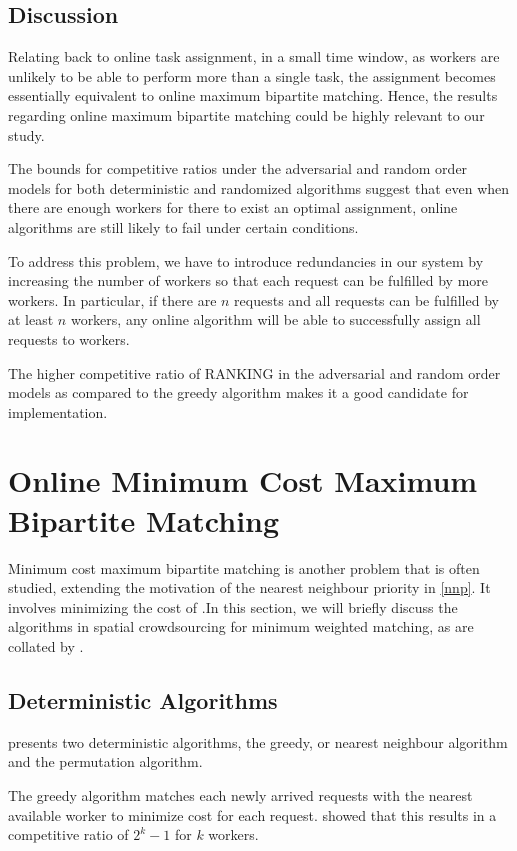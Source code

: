 \documentclass[urop]{socreport}
\begin{document}
\subsection{Discussion}
Relating back to online task assignment, in a small time window, as workers are unlikely to be able to perform more than a single task, the assignment becomes essentially equivalent to online maximum bipartite matching. Hence, the results regarding online maximum bipartite matching could be highly relevant to our study.  

The bounds for competitive ratios under the adversarial and random order models for both deterministic and randomized algorithms suggest that even when there are enough workers for there to exist an optimal assignment, online algorithms are still likely to fail under certain conditions. 

To address this problem, we have to introduce redundancies in our system by increasing the number of workers so that each request can be fulfilled by more workers. In particular, if there are $n$ requests and all requests can be fulfilled by at least $n$ workers, any online algorithm will be able to successfully assign all requests to workers. 

The higher competitive ratio of RANKING in the adversarial and random order models as compared to the greedy algorithm makes it a good candidate for implementation.


\section{Online Minimum Cost Maximum Bipartite Matching}
Minimum cost maximum bipartite matching is another problem that is often studied, extending the motivation of the nearest neighbour priority in \ref{nnp}. It involves minimizing the cost of .In this section, we will briefly discuss the algorithms in spatial crowdsourcing for minimum weighted matching, as are collated by \cite{tong}.
\subsection{Deterministic Algorithms}
\cite{greedy} presents two deterministic algorithms, the greedy, or nearest neighbour algorithm and the permutation algorithm.

The greedy algorithm matches each newly arrived requests with the nearest available worker to minimize cost for each request. \cite{greedy} showed that this results in a competitive ratio of $2^k - 1$ for $k$ workers.
\end{document}
